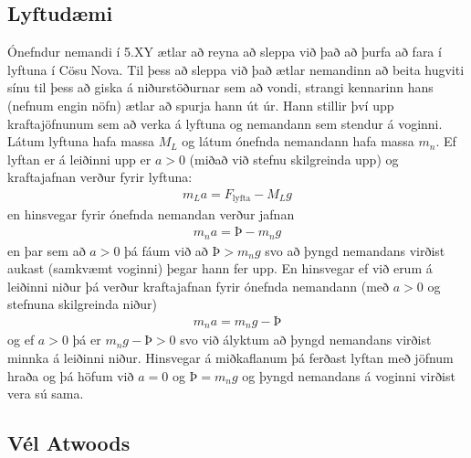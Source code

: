 \subsection*{Lyftudæmi}

Ónefndur nemandi í 5.XY ætlar að reyna að sleppa við það að þurfa að fara í lyftuna í Cösu Nova. Til þess að sleppa við það ætlar nemandinn að beita hugviti sínu til þess að giska á niðurstöðurnar sem að vondi, strangi kennarinn hans (nefnum engin nöfn) ætlar að spurja hann út úr. Hann stillir því upp kraftajöfnunum sem að verka á lyftuna og nemandann sem stendur á voginni. Látum lyftuna hafa massa $M_L$ og látum ónefnda nemandann hafa massa $m_n$. Ef lyftan er á leiðinni upp er $a > 0$ (miðað við stefnu skilgreinda upp) og kraftajafnan verður fyrir lyftuna:
\begin{align*}
    m_L a = F_{\text{lyfta}} - M_L g
\end{align*}
en hinsvegar fyrir ónefnda nemandan verður jafnan
\begin{align*}
    m_n a = Þ - m_n g
\end{align*}
en þar sem að $a > 0$ þá fáum við að $Þ > m_n g$ svo að þyngd nemandans virðist aukast (samkvæmt voginni) þegar hann fer upp. En hinsvegar ef við erum á leiðinni niður þá verður kraftajafnan fyrir ónefnda nemandann (með $a > 0$ og stefnuna skilgreinda niður)
\begin{align*}
    m_n a = m_n g - Þ
\end{align*}
og ef $a > 0$ þá er $m_ng - Þ > 0$ svo við ályktum að þyngd nemandans virðist minnka á leiðinni niður. Hinsvegar á miðkaflanum þá ferðast lyftan með jöfnum hraða og þá höfum við $a = 0$ og $Þ = m_ng$ og þyngd nemandans á voginni virðist vera sú sama.

\newpage

\subsection*{Vél Atwoods}

